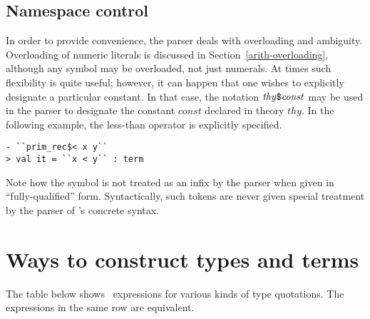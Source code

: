 \subsection{Namespace control}

In order to provide convenience, the parser deals with overloading and
ambiguity. Overloading of numeric literals is discussed in
Section~\ref{arith-overloading}, although any symbol may be
overloaded, not just numerals. At times such flexibility is quite
useful; however, it can happen that one wishes to explicitly designate
a particular constant. In that case, the notation
$\mathit{thy}\holtxt{\$}\mathit{const}$ may be used in the parser to
designate the constant $\mathit{const}$ declared in theory
$\mathit{thy}$. In the following example, the less-than operator is
explicitly specified.

\setcounter{sessioncount}{1}
\begin{session}
\begin{verbatim}
- ``prim_rec$< x y``
> val it = ``x < y`` : term
\end{verbatim}
\end{session}
Note how the \holtxt{<} symbol is not treated as an infix by the
parser when given in ``fully-qualified'' form.  Syntactically, such
tokens are never given special treatment by the parser of \HOL's
concrete syntax.
%

\section{Ways to construct types and terms}

The table below shows \ML\ expressions for various kinds of type
quotations.
The expressions in the same row are equivalent.

\bigskip

